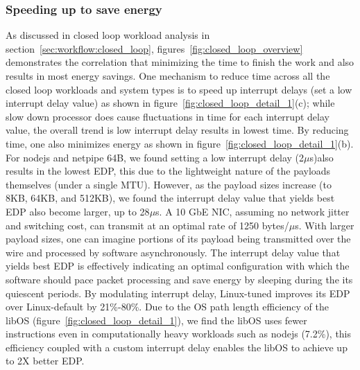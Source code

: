 
\subsubsection{Speeding up to save energy}
As discussed in closed loop workload analysis in section~\ref{sec:workflow:closed_loop}, figures~\ref{fig:closed_loop_overview} demonstrates the correlation that minimizing the time to finish the work and also results in most energy savings. One mechanism to reduce time across all the closed loop workloads and system types is to speed up interrupt delays (set a low interrupt delay value) as shown in figure~\ref{fig:closed_loop_detail_1}(c); while slow down processor does cause fluctuations in time for each interrupt delay value, the overall trend is low interrupt delay results in lowest time. By reducing time, one also minimizes energy as shown in figure~\ref{fig:closed_loop_detail_1}(b). For nodejs and netpipe 64B, we found setting a low interrupt delay (2$\mu$s)also results in the lowest EDP, this due to the lightweight nature of the payloads themselves (under a single MTU). However, as the payload sizes increase (to 8KB, 64KB, and 512KB), we found the interrupt delay value that yields best EDP also become larger, up to 28$\mu$s. A 10 GbE NIC, assuming no network jitter and switching cost, can transmit at an optimal rate of 1250 bytes/$\mu$s. With larger payload sizes, one can imagine portions of its payload being transmitted over the wire and processed by software asynchronously. The interrupt delay value that yields best EDP is effectively indicating an optimal configuration with which the software should pace packet processing and save energy by sleeping during the its quiescent periods. By modulating interrupt delay, Linux-tuned improves its EDP over Linux-default by 21\%-80\%. Due to the OS path length efficiency of the libOS (figure~\ref{fig:closed_loop_detail_1}), we find the libOS uses fewer instructions even in computationally heavy workloads such as nodejs (7.2\%), this efficiency coupled with a custom interrupt delay enables the libOS to achieve up to 2X better EDP.


